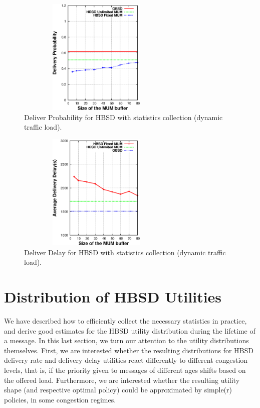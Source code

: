 \begin{figure}[!h]
  \begin{center}
    \includegraphics[width=3in,height=2.2in]{Chapitre3/fig11.eps}
  \end{center}
  \caption{Deliver Probability for HBSD with statistics collection (dynamic traffic load).}
  \label{HBSD-AVG-DR-DYNAMIC}
\end{figure}

\begin{figure}[!h]
  \begin{center}
    \includegraphics[width=3in,height=2.2in]{Chapitre3/fig12.eps}
  \end{center}
  \caption{Deliver Delay for HBSD with statistics collection (dynamic traffic load).}
  \label{HBSD-AVG-DD-DYNAMIC}
\end{figure}


\section{Distribution of HBSD Utilities}
\label{sec:HBSDUtilitiesDistributions}

We have described how to efficiently collect the necessary statistics in practice, and derive good estimates for the HBSD utility distribution during the lifetime of a message. In this last section, we turn our attention to the utility distributions themselves. First, we are interested whether the resulting distributions for HBSD delivery rate and delivery delay utilities react differently to different congestion levels, that is, if the priority given to messages of different ages shifts based on the offered load. Furthermore, we are interested whether the resulting utility shape (and respective optimal policy) could be approximated by simple(r) policies, in some congestion regimes.

